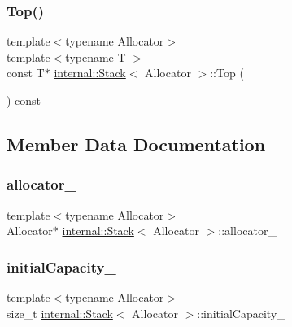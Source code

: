 \mbox{\label{classinternal_1_1Stack_abd8941a6b827a7ea359cb59b79d7a886}} 
\subsubsection{\texorpdfstring{Top()}{Top()}\hspace{0.1cm}{\footnotesize\ttfamily [2/2]}}
{\footnotesize\ttfamily template$<$typename Allocator$>$ \\
template$<$typename T $>$ \\
const T$\ast$ \hyperlink{classinternal_1_1Stack}{internal\+::\+Stack}$<$ Allocator $>$\+::Top (\begin{DoxyParamCaption}{ }\end{DoxyParamCaption}) const\hspace{0.3cm}{\ttfamily [inline]}}



\subsection{Member Data Documentation}
\mbox{\label{classinternal_1_1Stack_a029e18096d082b1c81d7e1075a15eaad}} 
\subsubsection{\texorpdfstring{allocator\+\_\+}{allocator\_}}
{\footnotesize\ttfamily template$<$typename Allocator$>$ \\
Allocator$\ast$ \hyperlink{classinternal_1_1Stack}{internal\+::\+Stack}$<$ Allocator $>$\+::allocator\+\_\+\hspace{0.3cm}{\ttfamily [private]}}

\mbox{\label{classinternal_1_1Stack_a224b9fa2406bc1c411068fa36c67c90f}} 
\subsubsection{\texorpdfstring{initial\+Capacity\+\_\+}{initialCapacity\_}}
{\footnotesize\ttfamily template$<$typename Allocator$>$ \\
size\+\_\+t \hyperlink{classinternal_1_1Stack}{internal\+::\+Stack}$<$ Allocator $>$\+::initial\+Capacity\+\_\+\hspace{0.3cm}{\ttfamily [private]}}


